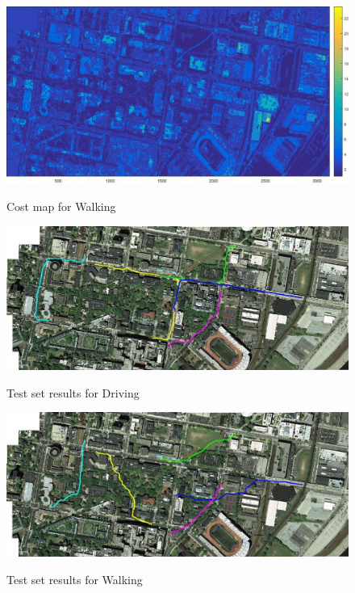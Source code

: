 \documentclass[fleqn,10pt]{SelfArx} %
\begin{document}
\begin{figure}[hbtp]
\caption{Cost map for Walking}
\centering
\includegraphics[scale=0.6]{costs_walk.jpg}
\label{fig:costWalk}
\end{figure}

\begin{figure}[hbtp]
\caption{Test set results for Driving}
\centering
\includegraphics[scale=0.6]{drive.jpg}
\label{fig:drive}
\end{figure}

\begin{figure}[hbtp]
\caption{Test set results for Walking}
\centering
\includegraphics[scale=0.6]{walk.jpg}
\label{fig:walk}
\end{figure}



%
%

\end{document}
